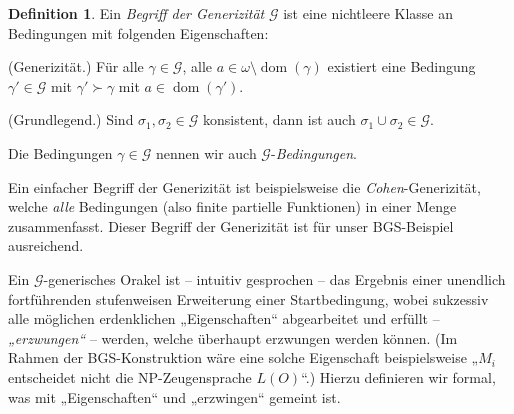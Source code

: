 \documentclass[nofonts]{uebung}
\theoremstyle{definition}
\newtheorem{definition}[theorem]{Definition}
\DeclareMathOperator{\dom}{dom}
\begin{document}
\begin{definition}\label{def:generizität}
    Ein \emph{Begriff der Generizität} $\mathcal G$ ist eine nichtleere Klasse an Bedingungen mit folgenden Eigenschaften:
    \begin{thmenum}
        \item\label{def:generizität-ext} (Generizität.) Für alle $\gamma\in\mathcal G$, alle $a\in \omega\setminus\dom(\gamma)$ existiert eine Bedingung $\gamma'\in\mathcal G$ mit $\gamma'\succ \gamma$ mit $a\in\dom(\gamma')$.
        \item\label{def:generizität-grundlegend} (Grundlegend.) Sind $\sigma_1, \sigma_2\in\mathcal G$ konsistent, dann ist auch $\sigma_1\cup\sigma_2\in\mathcal G$.
    \end{thmenum}
    Die Bedingungen $\gamma\in \mathcal G$ nennen wir auch $\mathcal G$-\emph{Bedingungen}.
\end{definition}

Ein einfacher Begriff der Generizität ist beispielsweise die \emph{Cohen}-Generizität, welche \emph{alle} Bedingungen (also finite partielle Funktionen) in einer Menge zusammenfasst.
Dieser Begriff der Generizität ist für unser BGS-Beispiel ausreichend.

Ein $\mathcal G$-generisches Orakel ist -- intuitiv gesprochen -- das Ergebnis einer unendlich fortführenden stufenweisen Erweiterung einer Startbedingung, wobei sukzessiv alle möglichen erdenklichen „Eigenschaften“ abgearbeitet und erfüllt -- \emph{„erzwungen“} -- werden, welche überhaupt erzwungen werden können. (Im Rahmen der BGS-Konstruktion wäre eine solche Eigenschaft beispielsweise „$M_i$ entscheidet nicht die NP-Zeugensprache $L(O)$“.)
Hierzu definieren wir formal, was mit „Eigenschaften“ und „erzwingen“ gemeint ist.
\end{document}
